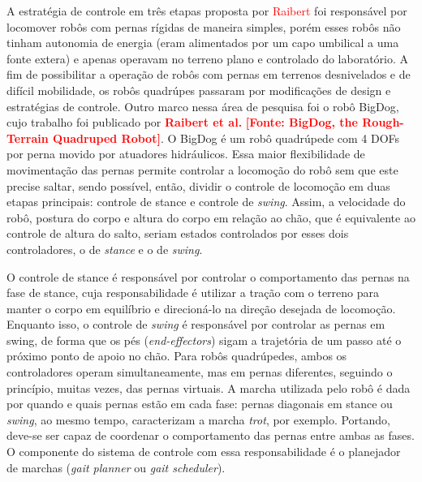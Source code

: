 \documentclass[../main.tex]{subfiles}
\begin{document}
  A estratégia de controle em três etapas proposta por \textcolor{red}{Raibert} foi responsável por locomover robôs com pernas rígidas de maneira simples, porém esses robôs não tinham autonomia de energia (eram alimentados por um capo umbilical a uma fonte extera) e apenas operavam no terreno plano e controlado do laboratório. A fim de possibilitar a operação de robôs com pernas em terrenos desnivelados e de difícil mobilidade, os robôs quadrúpes passaram por modificações de design e estratégias de controle. Outro marco nessa área de pesquisa foi o robô BigDog, cujo trabalho foi publicado por \textbf{\textcolor{red}{Raibert et al.}} \textbf{\textcolor{red}{[Fonte: BigDog, the Rough-Terrain Quadruped Robot]}}. O BigDog é um robô quadrúpede com 4 DOFs por perna movido por atuadores hidráulicos. Essa maior flexibilidade de movimentação das pernas permite controlar a locomoção do robô sem que este precise saltar, sendo possível, então, dividir o controle de locomoção em duas etapas principais: controle de stance e controle de \textit{swing}. Assim, a velocidade do robô, postura do corpo e altura do corpo em relação ao chão, que é equivalente ao controle de altura do salto, seriam estados controlados por esses dois controladores, o de \textit{stance} e o de \textit{swing}.

  O controle de stance é responsável por controlar o comportamento das pernas na fase de stance, cuja responsabilidade é utilizar a tração com o terreno para manter o corpo em equilíbrio e direcioná-lo na direção desejada de locomoção. Enquanto isso, o controle de \textit{swing} é responsável por controlar as pernas em swing, de forma que os pés (\textit{end-effectors}) sigam a trajetória de um passo até o próximo ponto de apoio no chão. Para robôs quadrúpedes, ambos os controladores operam simultaneamente, mas em pernas diferentes, seguindo o princípio, muitas vezes, das pernas virtuais. A marcha utilizada pelo robô é dada por quando e quais pernas estão em cada fase: pernas diagonais em stance ou \textit{swing}, ao mesmo tempo, caracterizam a marcha \textit{trot}, por exemplo. Portando, deve-se ser capaz de coordenar o comportamento das pernas entre ambas as fases. O componente do sistema de controle com essa responsabilidade é o planejador de marchas (\textit{gait planner} ou \textit{gait scheduler}).
\end{document}
